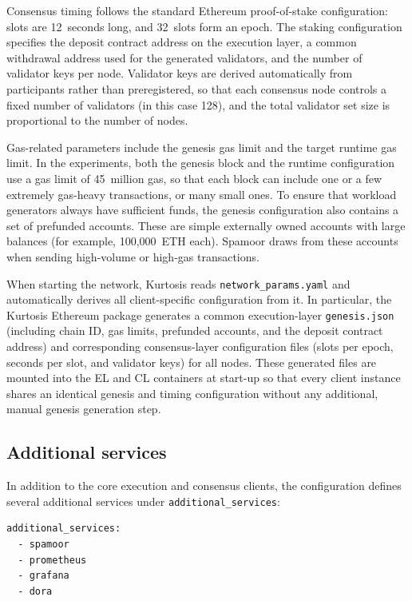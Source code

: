 Consensus timing follows the standard Ethereum proof-of-stake configuration: slots are 12~seconds long, and 32~slots form an epoch. The staking configuration specifies the deposit contract address on the execution layer, a common withdrawal address used for the generated validators, and the number of validator keys per node. Validator keys are derived automatically from participants rather than preregistered, so that each consensus node controls a fixed number of validators (in this case 128), and the total validator set size is proportional to the number of nodes.

Gas-related parameters include the genesis gas limit and the target runtime gas limit. In the experiments, both the genesis block and the runtime configuration use a gas limit of 45~million gas, so that each block can include one or a few extremely gas-heavy transactions, or many small ones. To ensure that workload generators always have sufficient funds, the genesis configuration also contains a set of prefunded accounts. These are simple externally owned accounts with large balances (for example, 100{,}000~ETH each). Spamoor draws from these accounts when sending high-volume or high-gas transactions.

When starting the network, Kurtosis reads \texttt{network\_params.yaml} and automatically derives all client-specific configuration from it. In particular, the Kurtosis Ethereum package generates a common execution-layer \texttt{genesis.json} (including chain ID, gas limits, prefunded accounts, and the deposit contract address) and corresponding consensus-layer configuration files (slots per epoch, seconds per slot, and validator keys) for all nodes. These generated files are mounted into the EL and CL containers at start-up so that every client instance shares an identical genesis and timing configuration without any additional, manual genesis generation step.


\subsection{Additional services}

In addition to the core execution and consensus clients, the configuration defines several additional services under \texttt{additional\_services}:

\begin{lstlisting}[caption={Additional services deployed alongside the Ethereum clients},label={lst:additional-services}]
additional_services:
  - spamoor
  - prometheus
  - grafana
  - dora
\end{lstlisting}

